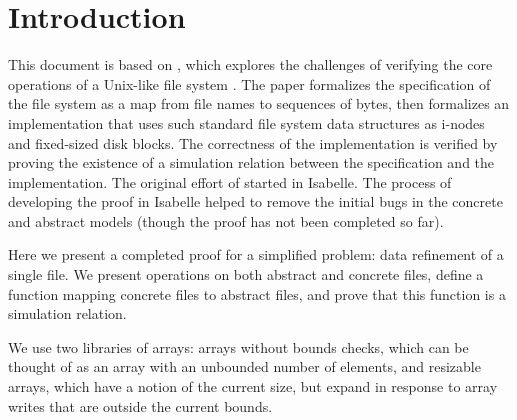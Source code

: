 \section{Introduction}

This document is based on
\cite{ArkoudasETAL04VerifyingFileSystemImplementationICFEM}, which
explores the challenges of verifying the core operations of a
Unix-like file system \cite{thompson78unix,mckusick84fast}.  The paper
\cite{ArkoudasETAL04VerifyingFileSystemImplementationICFEM} formalizes
the specification of the file system as a map from file names to
sequences of bytes, then formalizes an implementation that uses such
standard file system data structures as i-nodes and fixed-sized disk
blocks.  The correctness of the
implementation is verified by proving the existence of a simulation relation
\cite{RoeverEngelhardt98DataRefinement} between the specification and
the implementation.  The original effort of
\cite{ArkoudasETAL04VerifyingFileSystemImplementationICFEM} started in
Isabelle.  The process of developing the proof in Isabelle helped to 
remove the initial bugs in the concrete and
abstract models (though the proof has not been completed so far).  

Here we present a completed proof for a simplified problem:
data refinement of a single file.  We present operations on
both abstract and concrete files, define a function mapping
concrete files to abstract files, and prove that this
function is a simulation relation.

We use two libraries of arrays: arrays without bounds
checks, which can be thought of as an array with an
unbounded number of elements, and resizable arrays, which
have a notion of the current size, but expand in response to
array writes that are outside the current bounds.
